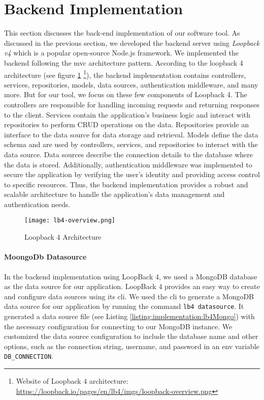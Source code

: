 \section{Backend Implementation}
\label{implementation:section:backend}
This section discusses the back-end implementation of our software tool. 
As discussed in the previous section, we developed the backend server using \textit{Loopback v4} which is a popular open-source Node.js framework.
We implemented the backend following the \ac{mvc} architecture pattern.
According to the loopback 4 architecture (see figure \ref{implementation:fig:loopbackarchitecture} \footnote{Website of Loopback 4 architecture: \url{https://loopback.io/pages/en/lb4/imgs/loopback-overview.png}}), the backend implementation contains controllers, services, repositories, models, data sources, authentication middleware, and many more.
But for our tool, we focus on these few components of Loopback 4. 
The controllers are responsible for handling incoming requests and returning responses to the client. 
Services contain the application's business logic and interact with repositories to perform CRUD operations on the data. 
Repositories provide an interface to the data source for data storage and retrieval. 
Models define the data schema and are used by controllers, services, and repositories to interact with the data source. 
Data sources describe the connection details to the database where the data is stored. 
Additionally, authentication middleware was implemented to secure the application by verifying the user's identity and providing access control to specific resources.
Thus, the backend implementation provides a robust and scalable architecture to handle the application's data management and authentication needs.
\begin{figure}[ht]
    \centering
    \texttt{[image: lb4-overview.png]}
    \caption[Loopback Architecture]{Loopback 4 Architecture}
    \label{implementation:fig:loopbackarchitecture}
\end{figure}

\paragraph{MoongoDb Datasource}
In the backend implementation using LoopBack 4, we used a MongoDB database as the data source for our application. 
LoopBack 4 provides an easy way to create and configure data sources using its \ac{cli}.
We used the \ac{cli} to generate a MongoDB data source for our application by running the command \texttt{lb4 datasource}. 
It generated a data source file (see Listing \ref{listing:implementation:lb4Mongo}) with the necessary configuration for connecting to our MongoDB instance.
We customized the data source configuration to include the database name and other options, such as the connection string, username, and password in an env variable \texttt{DB\_CONNECTION}.

